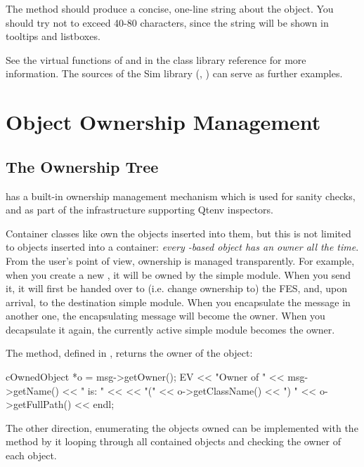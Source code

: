 The  method should produce a concise, one-line string
about the object. You should try not to exceed 40-80 characters, since the
string will be shown in tooltips and listboxes.

See the virtual functions of  and 
in the class library reference for more information. The sources of the
Sim library (, ) can serve as further examples.



\section{Object Ownership Management}
\label{sec:sim-lib:ownership-management}

\subsection{The Ownership Tree}
\label{sec:sim-lib:ownership-tree}

{\opp} has a built-in ownership management mechanism which
is used for sanity checks, and as part of the infrastructure
supporting Qtenv inspectors.

Container classes like  own the objects inserted
into them, but this is not limited to objects inserted into a container:
\textit{every -based object has an owner all the time}.
From the user's point of view, ownership is managed transparently.
For example, when you create a new ,
it will be owned by the simple module. When you send it, it will
first be handed over to (i.e. change ownership to) the FES, and,
upon arrival, to the destination simple module. When you encapsulate
the message in another one, the encapsulating message will become
the owner. When you decapsulate it again, the currently active
simple module becomes the owner.

The  method, defined in , returns the
owner of the object:

\begin{cpp}
cOwnedObject *o = msg->getOwner();
EV << "Owner of " << msg->getName() << " is: " <<
   << "(" << o->getClassName() << ") " << o->getFullPath() << endl;
\end{cpp}

The other direction, enumerating the objects owned can be implemented with
the  method by it looping through all
contained objects and checking the owner of each object.

